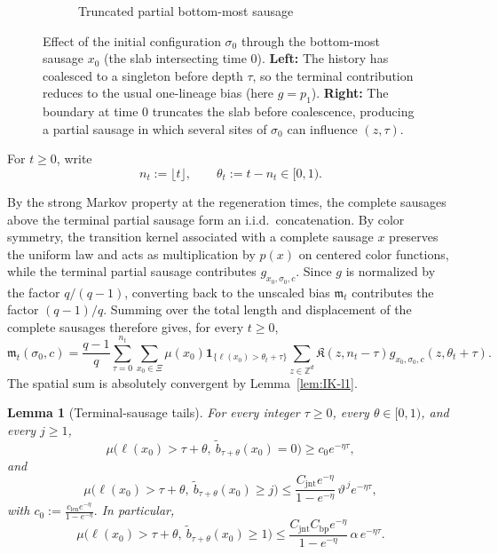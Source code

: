\documentclass[letterpaper,11pt,reqno]{amsart}
\newtheorem{lemma}[thm]{Lemma}
\theoremstyle{definition}
\newcommand{\IK}{\mathfrak{K}}
\begin{document}
\begin{figure}[htbp]
\begin{subfigure}[b]{0.46\textwidth}
\begin{tikzpicture}
\end{tikzpicture}
\caption{Truncated partial bottom-most sausage}
\end{subfigure}

\caption{Effect of the initial configuration $\sigma_0$ through the bottom-most sausage $x_0$ (the slab intersecting time $0$).
\textbf{Left:} The history has coalesced to a singleton before depth $\tau$, so the terminal contribution reduces to the usual one-lineage bias (here $g=p_1$).
\textbf{Right:} The boundary at time $0$ truncates the slab before coalescence, producing a partial sausage in which several sites of $\sigma_0$ can influence $(z,\tau)$.
}
\label{fig:nu_definition}
\end{figure}

For \(t\ge0\), write
\[
n_t:=\lfloor t\rfloor,
\qquad
\theta_t:=t-n_t\in[0,1).
\]

By the strong Markov property at the regeneration times, the complete
sausages above the terminal partial sausage form an i.i.d.\ concatenation.
By color symmetry, the transition kernel associated with a complete sausage
\(x\) preserves the uniform law and acts as multiplication by \(p(x)\) on 
centered color functions, while the terminal partial sausage contributes
\(g_{x_0,\sigma_0,c}\). Since \(g\) is normalized by the factor \(q/(q-1)\),
converting back to the unscaled bias \(\mathfrak m_t\) contributes the factor
\((q-1)/q\). Summing over the total length and displacement of the complete
sausages therefore gives, for every \(t\ge0\),
\begin{equation}\label{eq:mag-sausage}
    \mathfrak m_t(\sigma_0,c)
    =
    \frac{q-1}{q}
    \sum_{\tau=0}^{n_t}
    \sum_{x_0\in\Xi}
    \mu(x_0)\mathbf 1_{\{\ell(x_0)>\theta_t+\tau\}}
    \sum_{z\in\mathbb Z^d}
    \IK(z,n_t-\tau)
    g_{x_0,\sigma_0,c}(z,\theta_t+\tau).
\end{equation}
The spatial sum is absolutely convergent by
Lemma~\ref{lem:IK-l1}.



\begin{lemma}[Terminal-sausage tails]\label{lem:terminal-sausage-tails}
For every integer \(\tau\ge0\), every \(\theta\in[0,1)\), and every \(j\ge1\),
\[
\mu\bigl(\ell(x_0)>\tau+\theta,\ \tilde b_{\tau+\theta}(x_0)=0\bigr)
\ge c_0e^{-\eta\tau},
\]
and
\[
\mu\bigl(\ell(x_0)>\tau+\theta,\ \tilde b_{\tau+\theta}(x_0)\ge j\bigr)
\le
\frac{C_{\mathrm{jnt}}e^{-\eta}}{1-e^{-\eta}}\,
\vartheta^{\,j}e^{-\eta\tau},
\]
with $c_0:=
    \frac{c_{\mathrm{len}}e^{-\eta}}{1-e^{-\eta}}.$ In particular,
\[
\mu\bigl(\ell(x_0)>\tau+\theta,\ \tilde b_{\tau+\theta}(x_0)\ge1\bigr)
\le
\frac{C_{\mathrm{jnt}}C_{\mathrm{bp}}e^{-\eta}}{1-e^{-\eta}}\,
\alpha\,e^{-\eta\tau}.
\]
\end{lemma}
\end{document}
